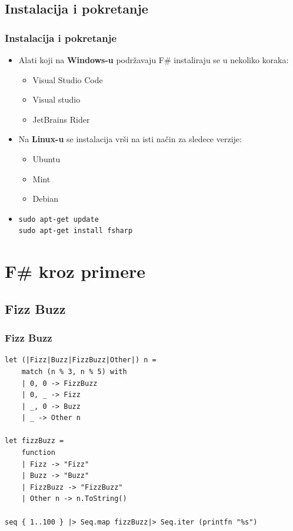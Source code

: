 \documentclass{beamer}
\begin{document}
\subsection*{Instalacija i pokretanje}
\begin{frame}[fragile]
\frametitle{Instalacija i pokretanje}

\begin{itemize}
\item Alati koji na \textbf{Windows-u} podržavaju F\# instaliraju se u nekoliko koraka:
	\begin{itemize}
	\item Visual Studio Code
	\item Visual studio
	\item JetBrains Rider
	\end{itemize}
\item Na \textbf{Linux-u} se instalacija vrši na isti način za sledece verzije:
	\begin{itemize}
	\item Ubuntu
	\item Mint
	\item Debian
	\end{itemize}
\item \begin{lstlisting}
sudo apt-get update
sudo apt-get install fsharp
\end{lstlisting}
\end{itemize}
\end{frame}


\section{F\# kroz primere}
\subsection*{Fizz Buzz}
\begin{frame}[fragile]
\frametitle{Fizz Buzz}
\begin{lstlisting}
let (|Fizz|Buzz|FizzBuzz|Other|) n =
    match (n % 3, n % 5) with
    | 0, 0 -> FizzBuzz
    | 0, _ -> Fizz
    | _, 0 -> Buzz
    | _ -> Other n

let fizzBuzz =
    function
    | Fizz -> "Fizz"
    | Buzz -> "Buzz"
    | FizzBuzz -> "FizzBuzz"
    | Other n -> n.ToString()

seq { 1..100 } |> Seq.map fizzBuzz|> Seq.iter (printfn "%s")
\end{lstlisting}

\end{frame}
\end{document}
